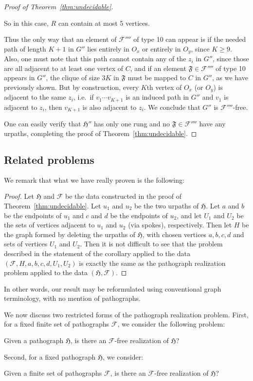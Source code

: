 \documentclass{article}
\newcommand{\Fc}{\mathcal{F}}
\newcommand{\Ff}{\mathfrak{F}}
\newcommand{\Hf}{\mathfrak{H}}
\begin{document}
\begin{proof}[Proof of Theorem~\ref{thm:undecidable}]
\begin{itemize}
    So in this case, $R$ can contain at most 5 vertices.
\end{itemize}

Thus the only way that an element of $\Fc''''$ of type 10 can appear is if the needed path of length $K+1$ in $G''$ lies entirely in $O_x$ or entirely in $O_y$, since $K\ge 9$. Also, one must note that this path cannot contain any of the $z_i$ in $G''$, since those are all adjacent to at least one vertex of $C$, and if an element $\Ff\in \Fc''''$ of type 10 appears in $G''$, the clique of size $3K$ in $\Ff$ must be mapped to $C$ in $G''$, as we have previously shown. But by construction, every $K$th vertex of $O_x$ (or $O_y$) is adjacent to the same $z_i$, i.e.\ if $v_1\cdots v_{K+1}$ is an induced path in $G''$ and $v_1$ is adjacent to $z_i$, then $v_{K+1}$ is also adjacent to $z_i$. We conclude that $G''$ is $\Fc''''$-free.

One can easily verify that $\Hf''$ has only one rung and no $\Ff\in\Fc''''$ have any urpaths, completing the proof of Theorem~\ref{thm:undecidable}.
\end{proof}

\subsection{Related problems}
\label{sec:variants}

We remark that what we have really proven is the following:

\paths*

\begin{proof}
Let $\Hf$ and $\Fc$ be the data constructed in the proof of Theorem~\ref{thm:undecidable}. Let $u_1$ and $u_2$ be the two urpaths of $\Hf$. Let $a$ and $b$ be the endpoints of $u_1$ and $c$ and $d$ be the endpoints of $u_2$, and let $U_1$ and $U_2$ be the sets of vertices adjacent to $u_1$ and $u_2$ (via spokes), respectively. Then let $H$ be the graph formed by deleting the urpaths of $\Hf$, with chosen vertices $a,b,c,d$ and sets of vertices $U_1$ and $U_2$. Then it is not difficult to see that the problem described in the statement of the corollary applied to the data $(\Fc, H, a, b, c, d, U_1, U_2)$ is exactly the same as the pathograph realization problem applied to the data $(\Hf, \Fc)$.
\end{proof}
In other words, our result may be reformulated using conventional graph terminology, with no mention of pathographs.

We now discuss two restricted forms of the pathograph realization problem. First, for a fixed finite set of pathographs $\Fc$, we consider the following problem:
\begin{problem}\label{prob:restrict1}
Given a pathograph $\Hf$, is there an $\Fc$-free realization of $\Hf$?
\end{problem}
Second, for a fixed pathograph $\Hf$, we consider:
\begin{problem}\label{prob:restrict2}
Given a finite set of pathographs $\Fc$, is there an $\Fc$-free realization of $\Hf$?
\end{problem}
\end{document}

